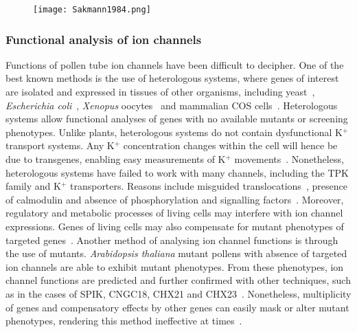 \documentclass[11pt]{article}
\begin{document}
\begin{multicols*}{2}
\begin{figure}[H]
  \centering
    \texttt{[image: Sakmann1984.png]}
  \label{fig:patchy}
\end{figure}

\subsubsection{Functional analysis of ion channels}
Functions of pollen tube ion channels have been difficult to decipher. One of the best known methods is the use of heterologous systems, where genes of interest are isolated and expressed in tissues of other organisms, including yeast~\citep{Latz2007}, \textit{Escherichia coli}~\citep{Uozumi1998}, \textit{Xenopus} oocytes~\citep{Leng1999} and mammalian COS cells~\citep{Mouline2002}. Heterologous systems allow functional analyses of genes with no available mutants or screening phenotypes. Unlike plants, heterologous systems do not contain dysfunctional K$^{+}$ transport systems. Any K$^{+}$ concentration changes within the cell will hence be due to transgenes, enabling easy measurements of K$^{+}$ movements~\citep{Frommer1995}.
\newline\newline
Nonetheless, heterologous systems have failed to work with many channels, including the TPK family and K$^{+}$ transporters. Reasons include misguided translocations~\citep{Marcel2010}, presence of calmodulin and absence of phosphorylation and signalling factors~\citep{Lebaudy2007a}. Moreover, regulatory and metabolic processes of living cells may interfere with ion channel expressions. Genes of living cells may also compensate for mutant phenotypes of targeted genes~\citep{Frommer1995}. 
\newline\newline
Another method of analysing ion channel functions is through the use of mutants. \textit{Arabidopsis thaliana} mutant pollens with absence of targeted ion channels are able to exhibit mutant phenotypes. From these phenotypes, ion channel functions are predicted and further confirmed with other techniques, such as in the cases of SPIK, CNGC18, CHX21 and CHX23~\citep{Frietsch2007,Mouline2002}. Nonetheless, multiplicity of genes and compensatory effects by other genes can easily mask or alter mutant phenotypes, rendering this method ineffective at times~\citep{Lu2011}.

\end{multicols*}
\end{document}
